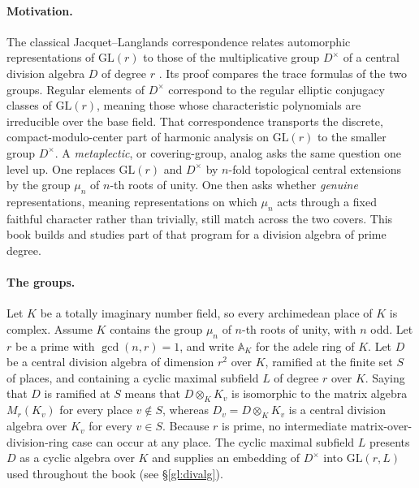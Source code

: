 \documentclass[12pt,letterpaper,oneside]{book}
\theoremstyle{plain}
\theoremstyle{definition}
\begin{document}
\paragraph{Motivation.} The classical Jacquet--Langlands correspondence relates automorphic representations of $\mathrm{GL}(r)$ to those of the multiplicative group $D^\times$ of a central division algebra $D$ of degree $r$ \cite{JL70,DKV84,Rog83,Bad08}. Its proof compares the trace formulas of the two groups. Regular elements of $D^\times$ correspond to the regular elliptic conjugacy classes of $\mathrm{GL}(r)$, meaning those whose characteristic polynomials are irreducible over the base field. That correspondence transports the discrete, compact-modulo-center part of harmonic analysis on $\mathrm{GL}(r)$ to the smaller group $D^\times$. A \emph{metaplectic}, or covering-group, analog asks the same question one level up. One replaces $\mathrm{GL}(r)$ and $D^\times$ by $n$-fold topological central extensions by the group $\mu_n$ of $n$-th roots of unity. One then asks whether \emph{genuine} representations, meaning representations on which $\mu_n$ acts through a fixed faithful character rather than trivially, still match across the two covers. This book builds and studies part of that program for a division algebra of prime degree.

\paragraph{The groups.} Let $K$ be a totally imaginary number field, so every archimedean place of $K$ is complex. Assume $K$ contains the group $\mu_n$ of $n$-th roots of unity, with $n$ odd. Let $r$ be a prime with $\gcd(n,r)=1$, and write $\mathbb A_K$ for the adele ring of $K$. Let $D$ be a central division algebra of dimension $r^2$ over $K$, ramified at the finite set $S$ of places, and containing a cyclic maximal subfield $L$ of degree $r$ over $K$. Saying that $D$ is ramified at $S$ means that $D\otimes_K K_v$ is isomorphic to the matrix algebra $M_r(K_v)$ for every place $v\notin S$, whereas $D_v = D\otimes_K K_v$ is a central division algebra over $K_v$ for every $v\in S$. Because $r$ is prime, no intermediate matrix-over-division-ring case can occur at any place. The cyclic maximal subfield $L$ presents $D$ as a cyclic algebra over $K$ and supplies an embedding of $D^\times$ into $\mathrm{GL}(r,L)$ used throughout the book (see \S\ref{gl:divalg}).
\end{document}
